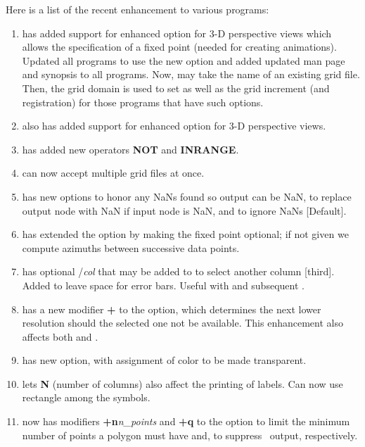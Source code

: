 Here is a list of the recent enhancement to various programs:

\begin{enumerate}
\item {} has added support for enhanced  option for 3-D perspective
	views which allows the specification of a fixed point (needed for
	creating animations).  Updated all programs to use the new option
	and added updated man page and synopsis to all programs.
	Now,  may take the name of an existing grid file. Then,
	the grid domain is used to set  as well as the grid
	increment (and registration) for those programs that have such options.
\item {} also has added support for enhanced  option for 3-D perspective views.
\item {} has added new operators {\bf NOT} and {\bf INRANGE}.
\item {} can now accept multiple grid files at once.
\item {} has new options  to honor any NaNs found so output can be NaN,
	 to replace output node with NaN if input node is NaN, and
	 to ignore NaNs [Default].
\item {} has extended the  option by making the fixed point
	optional; if not given we compute azimuths between successive data points.
\item {} has optional /{\it col} that may be added to  to select another column [third].
	Added  to leave space for error bars. Useful with  and subsequent  .
\item {} has a new modifier {\bf +} to the  option, which determines the
	next lower resolution should the selected one not be available.  This enhancement also affects
	both  and .
\item {} has new  option, with assignment of color to be made transparent.
\item {} lets {\bf N} (number of columns) also affect the printing of labels.
	Can now use rectangle among the symbols.
\item {} now has modifiers {\bf +n}{\it n\_points} and {\bf +q} to the  option to limit the minimum number of
	points a polygon must have and, to suppress \PS\ output, respectively.

\end{enumerate}
